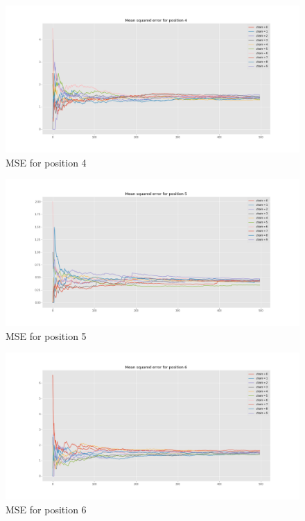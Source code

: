 \documentclass[]{article}
\begin{document}
\begin{figure}[H]
	\begin{center}
		
		\includegraphics[width=1\textwidth]{task4/figures/T_2_4/Q2/mse_pos4.png}
		\caption*{MSE for position 4}
	\end{center}
\end{figure}

\begin{figure}[H]
	\begin{center}
		
		\includegraphics[width=1\textwidth]{task4/figures/T_2_4/Q2/mse_pos5.png}
		\caption*{MSE for position 5}
	\end{center}
\end{figure}

\begin{figure}[H]
	\begin{center}
		
		\includegraphics[width=1\textwidth]{task4/figures/T_2_4/Q2/mse_pos6.png}
		\caption*{MSE for position 6}
	\end{center}
\end{figure}
\end{document}

